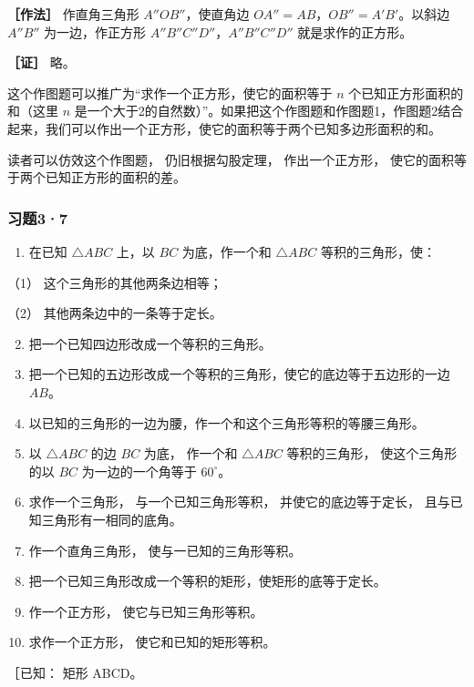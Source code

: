 \textbf{［作法］} 作直角三角形 \(A''OB''\)，使直角边
\(OA'' = AB\)，\(OB'' = A'B'\)。以斜边 \(A''B''\) 为一边，作正方形
\(A''B''C''D''\)，\(A''B''C''D''\) 就是求作的正方形。

\textbf{［证］} 略。

这个作图题可以推广为``求作一个正方形，使它的面积等于 \(n\)
个已知正方形面积的和（这里 \(n\)
是一个大于2的自然数）''。如果把这个作图题和作图题1，作图题2结合起来，我们可以作出一个正方形，使它的面积等于两个已知多边形面积的和。

读者可以仿效这个作图题， 仍旧根据勾股定理， 作出一个正方形，
使它的面积等于两个已知正方形的面积的差。

\subsubsection{习题3·7}

\begin{enumerate}
\item
  在已知 \(\triangle ABC\) 上，以 \(BC\) 为底，作一个和
  \(\triangle ABC\) 等积的三角形，使：
\end{enumerate}

（1） 这个三角形的其他两条边相等；

（2） 其他两条边中的一条等于定长。

\begin{enumerate}
\setcounter{enumi}{1}
\item
  把一个已知四边形改成一个等积的三角形。
\item
  把一个已知的五边形改成一个等积的三角形，使它的底边等于五边形的一边
  \(AB\)。
\item
  以已知的三角形的一边为腰，作一个和这个三角形等积的等腰三角形。
\item
  以 \(\triangle ABC\) 的边 \(BC\) 为底， 作一个和 \(\triangle ABC\)
  等积的三角形， 使这个三角形的以 \(BC\) 为一边的一个角等于
  \(60^{\circ}\)。
\item
  求作一个三角形， 与一个已知三角形等积， 并使它的底边等于定长，
  且与已知三角形有一相同的底角。
\item
  作一个直角三角形， 使与一已知的三角形等积。
\item
  把一个已知三角形改成一个等积的矩形，使矩形的底等于定长。
\item
  作一个正方形， 使它与已知三角形等积。
\item
  求作一个正方形， 使它和已知的矩形等积。
\end{enumerate}

［已知： 矩形 ABCD。


